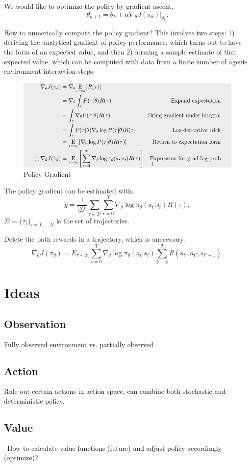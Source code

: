 \documentclass{article}
\begin{document}
    We would like to optimize the policy by gradient ascent, 
    $$
    \theta_{k+1} = \theta_k + \alpha \nabla_{\theta} J(\pi_{\theta})|_{\theta_k}.
    $$

    How to numerically compute the policy gradient? This involves two steps: 1) deriving the analytical gradient of policy performance, which turns out to have the form of an expected value, and then 2) forming a sample estimate of that expected value, which can be computed with data from a finite number of agent-environment interaction steps.
    \begin{figure}[H]
      \includegraphics[width=\linewidth]{derivative.png}
      \caption{Policy Gradient}
      \label{fig:policygradient}
    \end{figure}

    The policy gradient can be estimated with: 
    $$
    \hat{g} = \frac{1}{|\mathcal{D}|} \sum_{\tau \in \mathcal{D}} \sum_{t=0}^{T} \nabla_{\theta} \log \pi_{\theta}(a_t |s_t) R(\tau),
    $$
    $\mathcal{D} = \{\tau_i\}_{i=1,...,N}$ is the set of trajectories.

    Delete the path rewards in a trajectory, which is unecessary.
    $$
    \nabla_{\theta} J(\pi_{\theta}) = E_{\tau \sim \pi_{\theta}}{\sum_{t=0}^{T} \nabla_{\theta} \log \pi_{\theta}(a_t |s_t) \sum_{t'=t}^T R(s_{t'}, a_{t'}, s_{t'+1})}.
    $$


\section{Ideas}
    \subsection{Observation}
      Fully observed environment vs. partially observed\
    \subsection{Action}
      Rule out certain actions in action space, can combine both stochastic and deterministic policy.
    \subsection{Value}\
      How to calculate value functions (future) and adjust policy accordingly (optimize)? 
\end{document}
